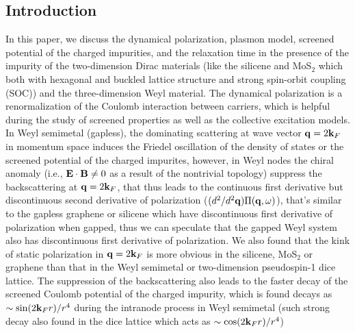 \documentclass[UTF8,a4paper]{article}
\begin{document}
\begin{large}

\section{Introduction}




In this paper, we discuss the dynamical polarization, plasmon model, screened potential of the charged impurities, and the relaxation time
in the presence of the impurity of the 
two-dimension Dirac materials (like the silicene and MoS$_{2}$ which both with hexagonal and buckled 
lattice structure and
strong spin-orbit coupling (SOC)) and the three-dimension Weyl material.
The dynamical polarization is a renormalization of the Coulomb interaction between carriers\cite{Malcolm J D},
which is helpful during the study of screened properties as well as the collective excitation models.
In Weyl semimetal (gapless), the dominating scattering at wave vector ${\bf q}=2{\bf k}_{F}$ in momentum space
induces the Friedel oscillation of the density of states or the screened potential of the charged impurites,
however, in Weyl nodes the chiral anomaly (i.e., ${\bf E}\cdot{\bf B}\neq 0$ as a result of the nontrivial topology) 
suppress the backscattering at ${\bf q}=2{\bf k}_{F}$,
that thus leads to the continuous first derivative but discontinuous second derivative of polarization ($(d^{2}/d^{2}{\bf q})\Pi({\bf q},\omega)$),
that's similar to the gapless graphene or silicene 
which have discontinuous first derivative of polarization when gapped,
thus we can speculate that the gapped Weyl system also has discontinuous first derivative of polarization.
We also found that
the kink of static polarization in ${\bf q}=2{\bf k}_{F}$ is more obvious in the silicene\cite{Wu C H3,XX,Wu C H_3}, MoS$_{2}$ or graphene
than that in the Weyl semimetal or two-dimension pseudospin-1 dice lattice\cite{Malcolm J D}.
The suppression of the backscattering also leads to the faster decay of the screened Coulomb potential of the charged impurity,
which is found decays as $\sim{\rm sin}(2{\bf k}_{F}r)/r^{4}$ during the intranode process in Weyl semimetal\cite{Lv M}
(such strong decay also found in the dice lattice which acts as $\sim{\rm cos}(2{\bf k}_{F}r)/r^{4}$\cite{Malcolm J D})

\end{large}
\end{document}
